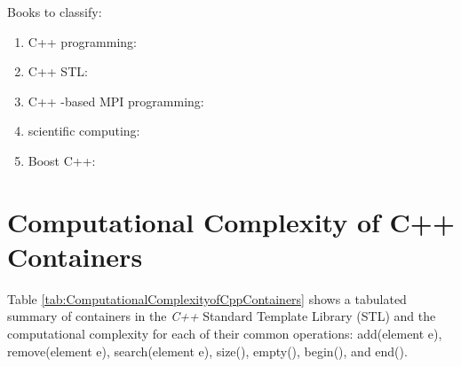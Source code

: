Books to classify: \vspace{-0.3cm}
\begin{enumerate} \itemsep -4pt
\item C++ programming: \cite{Horstmann2012,Katupitiya2006,Koenig2000,Pozrikidis2007,Prata2005,Romanik2003,Savitch2009,Scheinerman2006,Schildt1998a,Schildt2003a}
\item C++ STL: \cite{Josuttis2012,Karlsson2006a,Robson2000,HewlettPackardCompanyStaff2014,HewlettPackardCompanyStaff1994,Riesbeck2009,Cline2000,Cline2003,Cline2011}
\item C++ -based MPI programming: \cite{Karniadakis2003}
\item scientific computing: \cite{PittFrancis2012}
\item Boost C++: \cite{Mukherjee2015,Polukhin2013,Schaling2012}
\end{enumerate}










\section{Computational Complexity of C++ Containers}
\label{sec:ComputationalComplexityofCppContainers}


	Table \ref{tab:ComputationalComplexityofCppContainers} shows a tabulated summary of containers in the {\it C++} Standard Template Library (STL) and the computational complexity for each of their common operations: add(element e), remove(element e), search(element e), size(), empty(), begin(), and end(). \\

